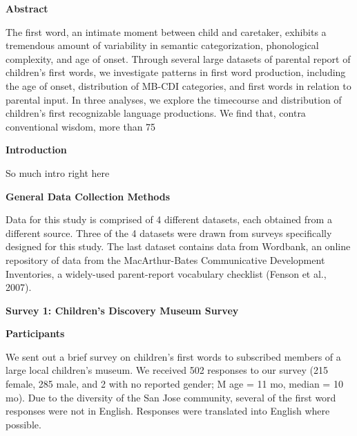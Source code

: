 \documentclass[10pt, a4paper]{article}
\begin{document}
\begin{multicols}{2}

\begin{center}
\textbf{Abstract}
\end{center}
The first word, an intimate moment between child and caretaker, exhibits a tremendous amount of variability in semantic categorization, phonological complexity, and age of onset. Through several large datasets of parental report of children’s first words, we investigate patterns in first word production, including the age of onset, distribution of MB-CDI categories, and first words in relation to parental input. In three analyses, we explore the timecourse and distribution of children’s first recognizable language productions. We find that, contra conventional wisdom, more than 75%

\begin{center}
\textbf{Introduction}
\end{center}
So much intro right here

\begin{center} 
\textbf{General Data Collection Methods}
\end{center}
Data for this study is comprised of 4 different datasets, each obtained from a different source. Three of the 4 datasets were drawn from surveys specifically designed for this study. The last dataset contains data from Wordbank, an online repository of data from the MacArthur-Bates Communicative Development Inventories, a widely-used parent-report vocabulary checklist (Fenson et al., 2007). 

\begin{center} 
\textbf{Survey 1: Children's Discovery Museum Survey}
\end{center}

\begin{center} 
\textbf{Participants}
\end{center}
We sent out a brief survey on children’s first words to subscribed members of a large local children’s museum. We received 502 responses to our survey (215 female, 285 male, and 2 with no reported gender; M age = 11 mo, median = 10 mo). Due to the diversity of the San Jose community, several of the first word responses were not in English. Responses were translated into English where possible.


\end{multicols}
\end{document}

